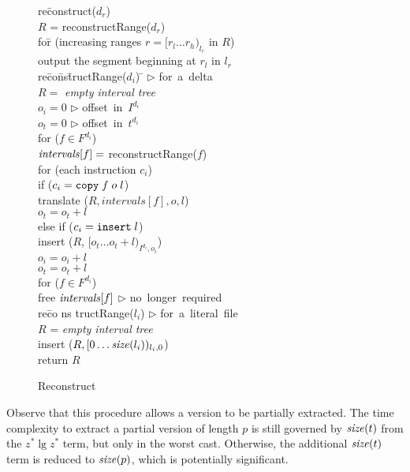 \documentclass{llncs}
\begin{document}
\begin{figure*}
\begin{program}
re\= construct($d_r$) \\
  \> $R$ = reconstructRange($d_r$) \\
  \> fo\= r (increasing ranges $r = [r_l \ldots r_h)_{l_r}$ in $R$) \\
  \>\> output the segment beginning at $r_l$ in $l_r$ \\
re\= co\= ns\= tructRange($d_i$) \hspace{3cm} \= $\triangleright$ \hbox{for a delta} \\
\> $R =$ \textrm{\emph{empty interval tree}} \\
\> $o_i = 0$ \>\>\> $\triangleright$ \hbox{offset in $I^{d_i}$} \\
\> $o_t = 0$ \>\>\> $\triangleright$ \hbox{offset in $t^{d_i}$} \\
\> for ($f \in F^{d_i}$) \\
\>\> $\textrm{{\emph{intervals}}}[f] =$ reconstructRange($f$) \\
\> for (each instruction $c_i$) \\
\>\> if ($c_i = \texttt{copy} \; f \; o \; l$) \\
\>\>\> translate ($R, intervals[f], o, l$) \\
\>\>\> $o_t = o_t + l$ \\
\>\> else if ($c_i = \texttt{insert} \; l$) \\
\>\>\> insert ($R$, $[o_t \ldots o_t + l)_{I^{d_i},o_i}$) \\
\>\>\> $o_i = o_i + l$ \\
\>\>\> $o_t = o_t + l$ \\
\> for ($f \in F^{d_i}$) \\
\>\> free $\textrm{{\emph{intervals}}}[f]$ \>\> $\triangleright$ \hbox{no longer required} \\
re\= co\> ns\> tructRange($l_i$)              \> $\triangleright$ \hbox{for a literal file} \\
\> $R$ = \textrm{\emph{empty interval tree}} \\
\> insert ($R, [0 \ldots \textrm{\emph{size}}(l_i))_{l_i,0}$) \\
\> return $R$ \\
\end{program}
\caption{Reconstruct}\label{fig:reconstruct}
\end{figure*}

Observe that this procedure allows a version to be partially
extracted.  The time complexity to extract a partial version of length
$p$ is still governed by $\textrm{\emph{size}}(t)$ from the $z^* \lg z^*$ term, but
only in the worst cast.  Otherwise, the additional $\textrm{\emph{size}}(t)$ term is
reduced to $\textrm{\emph{size}}(p)$, which is potentially significant.
\end{document}
